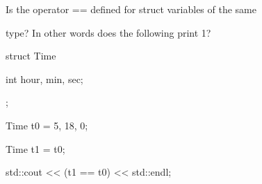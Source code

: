 Is the operator == defined for struct variables of the same

type? In other words does the following print 1?



\begin{consolethree}[escapeinside=||]

struct Time

{

    int hour, min, sec;

};

Time t0 = {5, 18, 0};

Time t1 = t0;



std::cout << (t1 == t0) << std::endl;

\end{consolethree}

